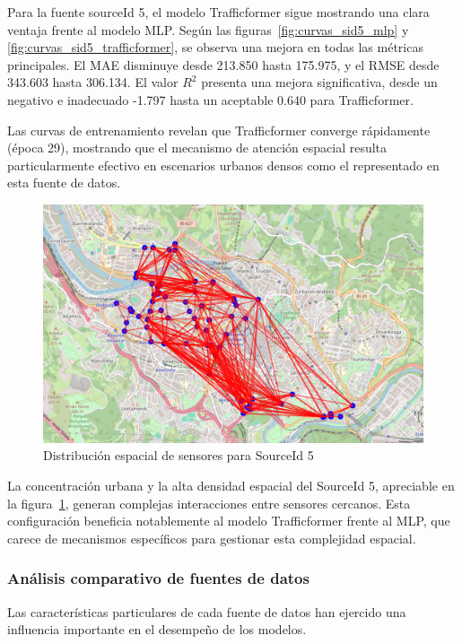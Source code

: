 Para la fuente sourceId 5, el modelo Trafficformer sigue mostrando una clara ventaja frente al modelo MLP. Según las figuras~\ref{fig:curvas_sid5_mlp} y \ref{fig:curvas_sid5_trafficformer}, se observa una mejora en todas las métricas principales. El MAE disminuye desde 213.850 hasta 175.975, y el RMSE desde 343.603 hasta 306.134. El valor $R^2$ presenta una mejora significativa, desde un negativo e inadecuado -1.797 hasta un aceptable 0.640 para Trafficformer.

Las curvas de entrenamiento revelan que Trafficformer converge rápidamente (época 29), mostrando que el mecanismo de atención espacial resulta particularmente efectivo en escenarios urbanos densos como el representado en esta fuente de datos.

\begin{figure}[H]
	\centering
	\includegraphics[width=0.7\linewidth]{includes/cap5/source_id_5_meters_mask.png}
	\caption{Distribución espacial de sensores para SourceId 5}
	\label{fig:sensores_sid5}
\end{figure}

La concentración urbana y la alta densidad espacial del SourceId 5, apreciable en la figura~\ref{fig:sensores_sid5}, generan complejas interacciones entre sensores cercanos. Esta configuración beneficia notablemente al modelo Trafficformer frente al MLP, que carece de mecanismos específicos para gestionar esta complejidad espacial.

\subsubsection*{Análisis comparativo de fuentes de datos}

Las características particulares de cada fuente de datos han ejercido una influencia importante en el desempeño de los modelos.

